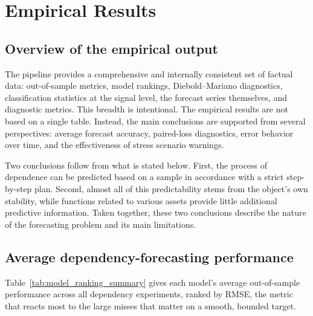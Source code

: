 \section{Empirical Results}

\subsection{Overview of the empirical output}
\label{sec:results_overview}

The pipeline provides a comprehensive and internally consistent set of factual data: out-of-sample metrics, model rankings, Diebold--Mariano diagnostics, classification statistics at the signal level, the forecast series themselves, and diagnostic metrics. This breadth is intentional. The empirical results are not based on a single table. Instead, the main conclusions are supported from several perspectives: average forecast accuracy, paired-loss diagnostics, error behavior over time, and the effectiveness of stress scenario warnings.

Two conclusions follow from what is stated below. First, the process of dependence can be predicted based on a sample in accordance with a strict step-by-step plan. Second, almost all of this predictability stems from the object's own stability, while functions related to various assets provide little additional predictive information. Taken together, these two conclusions describe the nature of the forecasting problem and its main limitations.

\subsection{Average dependency-forecasting performance}

Table~\ref{tab:model_ranking_summary} gives each model's average out-of-sample performance across all dependency experiments, ranked by RMSE, the metric that reacts most to the large misses that matter on a smooth, bounded target.

